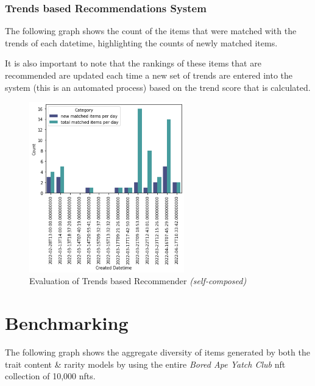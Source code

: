 \subsubsection{Trends based Recommendations System}

The following graph shows the count of the items that were matched with the trends of each datetime, highlighting the counts of newly matched items.

It is also important to note that the rankings of these items that are recommended are updated each time a new set of trends are entered into the system (this is an automated process) based on the trend score that is calculated.

\begin{figure}[h!]
\centering
\includegraphics[width=0.6\textwidth]{images/Testing/trends/trends-matches-eval1.png}
\caption{Evaluation of Trends based Recommender \textit{(self-composed)}}
\label{fig:trends-recsys-new-matches}
\end{figure}


\section{Benchmarking}
\label{sec:test-benchmarking}

The following graph shows the aggregate diversity of items generated by both the trait content \& rarity models by using the entire \textit{Bored Ape Yatch Club} \gls{nft} collection of 10,000 \gls{nft}s.

